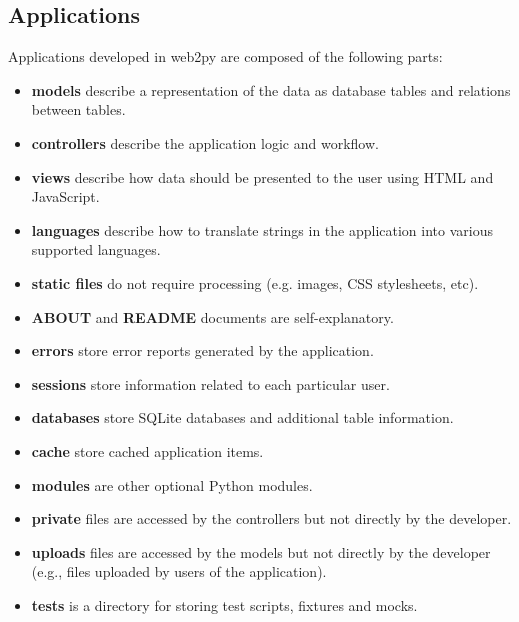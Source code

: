 \documentclass[justified,sixbynine,notoc]{tufte-book}
\begin{document}
\begin{fullwidth}
\goodbreak\section{Applications}

Applications developed in web2py are composed of the following parts:
\begin{itemize}
\item {\bf models} describe a representation of the data as database tables and relations between tables.

\item {\bf controllers} describe the application logic and workflow.

\item {\bf views} describe how data should be presented to the user using HTML and JavaScript.

\item {\bf languages} describe how to translate strings in the application into various supported languages.

\item {\bf static files} do not require processing (e.g. images, CSS stylesheets, etc).

\item {\bf ABOUT} and {\bf README} documents are self-explanatory.

\item {\bf errors} store error reports generated by the application.

\item {\bf sessions} store information related to each particular user.

\item {\bf databases} store SQLite databases and additional table information.

\item {\bf cache} store cached application items.

\item {\bf modules} are other optional Python modules.

\item {\bf private} files are accessed by the controllers but not directly by the developer.

\item {\bf uploads} files are accessed by the models but not directly by the developer (e.g., files uploaded by users of the application).

\item {\bf tests} is a directory for storing test scripts, fixtures and mocks.
\end{itemize}


\end{fullwidth}
\end{document}
